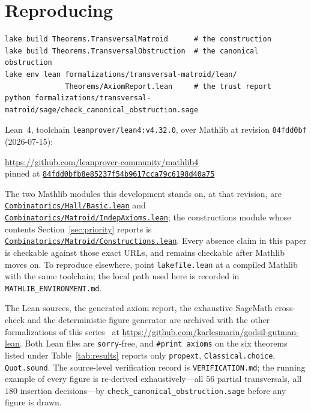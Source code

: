 \documentclass[11pt]{article}
\newcommand{\lean}[1]{\texttt{#1}}
\begin{document}
\section*{Reproducing}

\begin{verbatim}
lake build Theorems.TransversalMatroid      # the construction
lake build Theorems.TransversalObstruction  # the canonical obstruction
lake env lean formalizations/transversal-matroid/lean/
              Theorems/AxiomReport.lean     # the trust report
python formalizations/transversal-matroid/sage/check_canonical_obstruction.sage
\end{verbatim}
{\sloppy Lean~4, toolchain \lean{leanprover/lean4:v4.32.0}, over Mathlib at revision
\lean{84fdd0bf} (2026-07-15):
\begin{center}
\url{https://github.com/leanprover-community/mathlib4}\\[2pt]
pinned at
\href{https://github.com/leanprover-community/mathlib4/commit/84fdd0bfb8e85237f54b9617cca79c6198d40a75}%
{\lean{84fdd0bfb8e85237f54b9617cca79c6198d40a75}}
\end{center}
The two Mathlib modules this development stands on, at that revision, are
\href{https://github.com/leanprover-community/mathlib4/blob/84fdd0bfb8e85237f54b9617cca79c6198d40a75/Mathlib/Combinatorics/Hall/Basic.lean}%
{\lean{Combinatorics/Hall/Basic.lean}} and
\href{https://github.com/leanprover-community/mathlib4/blob/84fdd0bfb8e85237f54b9617cca79c6198d40a75/Mathlib/Combinatorics/Matroid/IndepAxioms.lean}%
{\lean{Combinatorics/Matroid/IndepAxioms.lean}}; the constructions module whose contents
Section~\ref{sec:priority} reports is
\href{https://github.com/leanprover-community/mathlib4/blob/84fdd0bfb8e85237f54b9617cca79c6198d40a75/Mathlib/Combinatorics/Matroid/Constructions.lean}%
{\lean{Combinatorics/Matroid/Constructions.lean}}. Every absence claim in this paper is checkable
against those exact URLs, and remains checkable after Mathlib moves on. To reproduce elsewhere,
point \lean{lakefile.lean} at a compiled Mathlib with the same toolchain; the local path used here
is recorded in \lean{MATHLIB\_ENVIRONMENT.md}.\par}

{\sloppy The Lean sources, the generated axiom report, the exhaustive SageMath cross-check and the
deterministic figure generator are archived with the other formalizations of this
series~\cite{neumann,gglean,newtonlean} at
\url{https://github.com/karlesmarin/godsil-gutman-lean}. Both Lean files are \lean{sorry}-free, and
\lean{\#print axioms} on the six theorems listed under Table~\ref{tab:results} reports only
\lean{propext}, \lean{Classical.choice}, \lean{Quot.sound}. The source-level verification record is
\lean{VERIFICATION.md}; the running example of every figure is re-derived exhaustively---all $56$
partial transversals, all $180$ insertion decisions---by
\lean{check\_canonical\_obstruction.sage} before any figure is drawn.\par}
\end{document}
